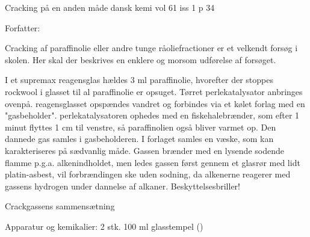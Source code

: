 Cracking på en anden måde
dansk kemi vol 61 iss 1 p 34

Forfatter:

Cracking af paraffinolie eller andre tunge råoliefractioner er et velkendt
forsøg i skolen. Her skal der beskrives en enklere og morsom udførelse af
forsøget.

I et supremax reagensglas hældes 3 ml paraffinolie, hvorefter der stoppes
rockwool i glasset til al paraffinolie er opsuget. Tørret perlekatalysator
anbringes ovenpå. reagensglasset opspændes vandret og forbindes via et kølet
forlag med en "gasbeholder". perlekatalysatoren ophedes med en fiskehalebrænder,
som efter 1 minut flyttes 1 cm til venstre, så paraffinolien også bliver varmet
op. Den dannede gas samles i gasbeholderen. I forlaget samles en væske, som kan
karakteriseres på sædvanlig måde. Gassen brænder med en lysende sodende flamme
p.g.a. alkenindholdet, men ledes gassen først gennem et glasrør med lidt
platin-asbest, vil forbrændingen ske uden sodning, da alkenerne reagerer med
gassens hydrogen under dannelse af alkaner. Beskyttelsesbriller!

Crackgassens sammensætning

Apparatur og kemikalier: 2 stk. 100 ml glasstempel ()
